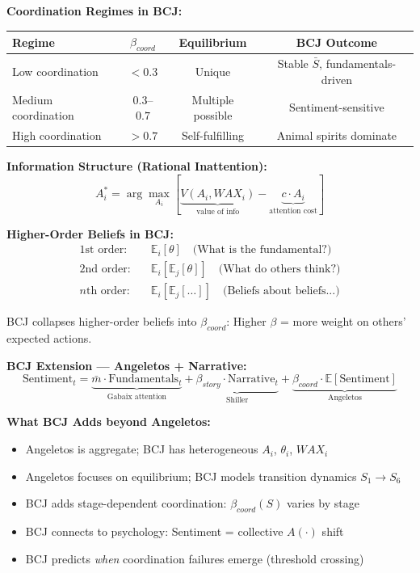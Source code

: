 \begin{tcolorbox}[colback=green!5!white, colframe=green!75!black,
    title=Theorem BCJ-T33: Angeletos Coordination \& Sentiment as Special Case]
\textbf{Coordination Regimes in BCJ:}
\begin{center}
\begin{tabular}{lccc}
\toprule
\textbf{Regime} & \textbf{$\beta_{coord}$} & \textbf{Equilibrium} & \textbf{BCJ Outcome} \\
\midrule
Low coordination & $< 0.3$ & Unique & Stable $\bar{S}$, fundamentals-driven \\
Medium coordination & $0.3$--$0.7$ & Multiple possible & Sentiment-sensitive \\
High coordination & $> 0.7$ & Self-fulfilling & Animal spirits dominate \\
\bottomrule
\end{tabular}
\end{center}

\textbf{Information Structure (Rational Inattention):}
\begin{equation}
A_i^* = \arg\max_{A_i} \left[\underbrace{V(A_i, WAX_i)}_{\text{value of info}} - \underbrace{c \cdot A_i}_{\text{attention cost}}\right]
\end{equation}

\textbf{Higher-Order Beliefs in BCJ:}
\begin{align}
\text{1st order:} \quad & \mathbb{E}_i[\theta] \quad \text{(What is the fundamental?)} \\
\text{2nd order:} \quad & \mathbb{E}_i[\mathbb{E}_j[\theta]] \quad \text{(What do others think?)} \\
\text{$n$th order:} \quad & \mathbb{E}_i[\mathbb{E}_j[\ldots]] \quad \text{(Beliefs about beliefs...)}
\end{align}

BCJ collapses higher-order beliefs into $\beta_{coord}$: Higher $\beta$ = more weight on others' expected actions.

\textbf{BCJ Extension --- Angeletos + Narrative:}
\begin{equation}
\text{Sentiment}_t = \underbrace{\bar{m} \cdot \text{Fundamentals}_t}_{\text{Gabaix attention}} + \underbrace{\beta_{story} \cdot \text{Narrative}_t}_{\text{Shiller}} + \underbrace{\beta_{coord} \cdot \mathbb{E}[\text{Sentiment}]}_{\text{Angeletos}}
\end{equation}

\textbf{What BCJ Adds beyond Angeletos:}
\begin{itemize}[nosep]
\item Angeletos is aggregate; BCJ has heterogeneous $A_i$, $\theta_i$, $WAX_i$
\item Angeletos focuses on equilibrium; BCJ models transition dynamics $S_1 \to S_6$
\item BCJ adds stage-dependent coordination: $\beta_{coord}(S)$ varies by stage
\item BCJ connects to psychology: Sentiment = collective $A(\cdot)$ shift
\item BCJ predicts \textit{when} coordination failures emerge (threshold crossing)
\end{itemize}


\end{tcolorbox}
